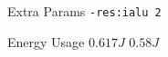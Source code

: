
        \begin{tcolorbox}[width=\linewidth, colback=white!95!black, colframe=white!95!black]
            
            
            Extra Params \hfill \verb|-res:ialu 2|

            Energy Usage \hfill \st{$0.617J$} $0.58J$

        \end{tcolorbox}
    